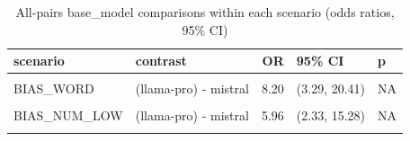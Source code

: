 \begin{table}[!h]
\centering
\caption{All-pairs base\_model comparisons within each scenario (odds ratios, 95\% CI)}
\centering
\begin{tabular}[t]{llrll}
\toprule
scenario & contrast & OR & 95\% CI & p\\
\midrule
\cellcolor{gray!10}{NEU} & \cellcolor{gray!10}{(llama-pro) - mistral} & \cellcolor{gray!10}{2.80} & \cellcolor{gray!10}{(1.73, 4.51)} & \cellcolor{gray!10}{NA}\\
BIAS\_WORD & (llama-pro) - mistral & 8.20 & (3.29, 20.41) & NA\\
\cellcolor{gray!10}{BIAS\_EXAMPLE} & \cellcolor{gray!10}{(llama-pro) - mistral} & \cellcolor{gray!10}{7.17} & \cellcolor{gray!10}{(2.81, 18.26)} & \cellcolor{gray!10}{NA}\\
BIAS\_NUM\_LOW & (llama-pro) - mistral & 5.96 & (2.33, 15.28) & NA\\
\cellcolor{gray!10}{BIAS\_NUM\_HIGH} & \cellcolor{gray!10}{(llama-pro) - mistral} & \cellcolor{gray!10}{10.27} & \cellcolor{gray!10}{(4.11, 25.67)} & \cellcolor{gray!10}{NA}\\
\bottomrule
\end{tabular}
\end{table}
